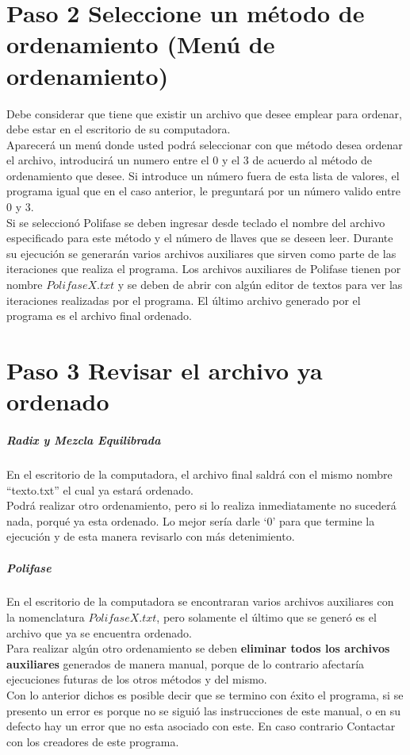 \documentclass[12pt]{report}
\begin{document}
	\chapter{Paso 2 Seleccione un método de ordenamiento (Menú de ordenamiento)}
	Debe considerar que tiene que existir un archivo que desee emplear para ordenar, debe estar en el escritorio de su computadora.\\
	
	Aparecerá un menú donde usted podrá seleccionar con que método desea ordenar el archivo, introducirá un numero entre el 0 y el 3 de acuerdo al método de ordenamiento que desee.
	Si introduce un número fuera de esta lista de valores, el programa igual que en el caso anterior, le preguntará por un número valido entre 0 y 3.\\
	
	Si se seleccionó Polifase se deben ingresar desde teclado el nombre del archivo especificado para este método y el número de llaves que se deseen leer. Durante su ejecución se
	generarán varios archivos auxiliares que sirven como parte de las iteraciones que realiza el programa. Los archivos auxiliares de Polifase tienen por nombre $PolifaseX.txt$ y se deben de
	abrir con algún editor de textos para ver las iteraciones realizadas por el programa. El último archivo generado por el programa es el archivo final ordenado.

	\chapter{Paso 3 Revisar el archivo ya ordenado}
	\paragraph{Radix y Mezcla Equilibrada}
	En el escritorio de la computadora, el archivo final saldrá con el mismo nombre ``texto.txt'' el cual ya estará ordenado.\\
	
	Podrá realizar otro ordenamiento, pero si lo realiza inmediatamente no sucederá nada, porqué ya esta ordenado. Lo mejor sería  darle `0' para que termine la ejecución y de esta manera revisarlo con más detenimiento.
	
	\paragraph{Polifase}
	En el escritorio de la computadora se encontraran varios archivos auxiliares con la nomenclatura $PolifaseX.txt$, pero solamente el último que se generó es el archivo
	que ya se encuentra ordenado.\\
	
	Para realizar algún otro ordenamiento se deben \textbf{eliminar todos los archivos auxiliares} generados de manera manual, porque de lo contrario afectaría ejecuciones
	futuras de los otros métodos y del mismo.\\
	
	Con lo anterior dichos es posible decir que se termino con éxito el programa, si se presento un error es porque no se siguió las instrucciones de este manual,
	o en su defecto hay un error que no esta asociado con este. 
	En caso contrario Contactar con los creadores de este  programa.
\end{document}

